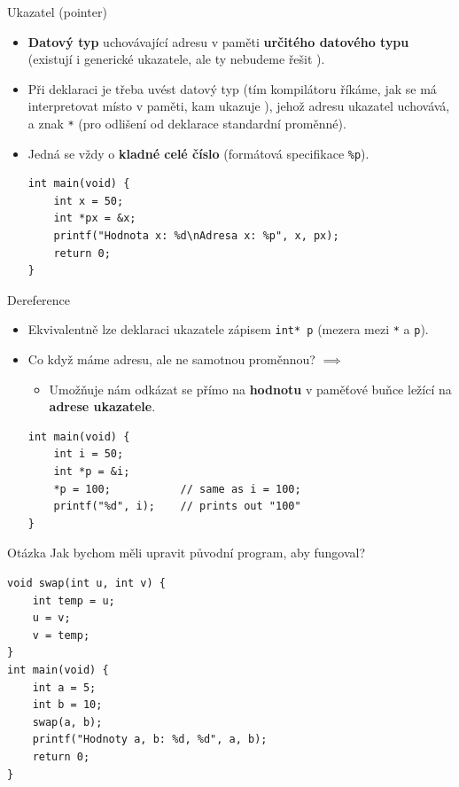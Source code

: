 \documentclass[14pt,aspectratio=169]{beamer}
\begin{document}
    \begin{frame}[t,fragile]{Ukazatel (pointer)}
        \begin{itemize}
            \item \textbf{Datový typ} uchovávající adresu v paměti \textbf{určitého datového typu} (existují i generické ukazatele, ale ty nebudeme řešit ).
            \item Při deklaraci je třeba uvést datový typ (tím kompilátoru říkáme, jak se má interpretovat místo v paměti, kam ukazuje ), jehož adresu ukazatel uchovává, a znak \texttt{*} (pro odlišení od deklarace standardní proměnné).
            \item Jedná se vždy o \textbf{kladné celé číslo} (formátová specifikace \texttt{\%p}).
            \begin{lstlisting}
int main(void) {
    int x = 50;
    int *px = &x;
    printf("Hodnota x: %d\nAdresa x: %p", x, px);
    return 0;
}
            \end{lstlisting}
        \end{itemize}
    \end{frame}

    \begin{frame}[t,fragile]{Dereference}
        \begin{itemize}
            \item Ekvivalentně lze deklaraci ukazatele zápisem \texttt{int* p} (mezera mezi \texttt{*} a \texttt{p}).
            \item Co když máme adresu, ale ne samotnou proměnnou? $\implies$ 
            \begin{itemize}
                \item Umožňuje nám odkázat se přímo na \textbf{hodnotu} v paměťové buňce ležící na \textbf{adrese ukazatele}.
            \end{itemize}
            \begin{lstlisting}
int main(void) {
    int i = 50;
    int *p = &i;
    *p = 100;           // same as i = 100;
    printf("%d", i);    // prints out "100"
}
            \end{lstlisting}
        \end{itemize}
    \end{frame}

    \begin{frame}[t,fragile]{Otázka}
        Jak bychom měli upravit původní program, aby fungoval?
        \begin{lstlisting}
void swap(int u, int v) {
    int temp = u;
    u = v;
    v = temp;
}
int main(void) {
    int a = 5;
    int b = 10;
    swap(a, b);
    printf("Hodnoty a, b: %d, %d", a, b);
    return 0;
}
        \end{lstlisting}
    \end{frame}
\end{document}
